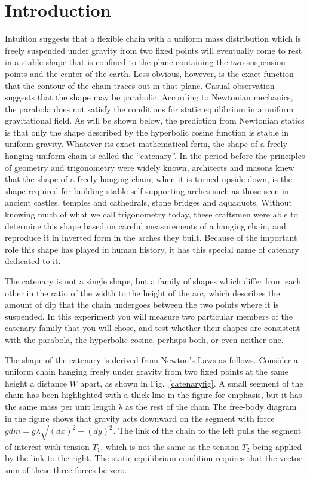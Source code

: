 \documentclass{revtex4}
\begin{document}
\section{Introduction}

Intuition suggests that a flexible chain with a uniform mass distribution
which is freely suspended under gravity from two fixed points will eventually
come to rest in a stable shape that is confined to the plane containing the
two suspension points and the center of the earth. Less obvious, however,
is the exact function that the contour of the chain traces out in that plane.
Casual observation suggests that the shape may be parabolic.  According to
Newtonian mechanics, the parabola does not satisfy the conditions for static
equilibrium in a uniform gravitational field.  As will be shown below, the
prediction from Newtonian statics is that only the shape described by the
hyperbolic cosine function is stable in uniform gravity.  Whatever its exact
mathematical form, the shape of a freely hanging uniform chain is called the
``catenary''.  In the period before the principles of geometry and
trigonometry were widely known, architects and masons knew that the shape
of a freely hanging chain, when it is turned upside-down, is the shape
required for building stable self-supporting arches such as those seen in
ancient castles, temples and cathedrals, stone bridges and aquaducts.
Without knowing much of what we call trigonometry today, these craftsmen
were able to determine this shape based on careful measurements of a hanging
chain, and reproduce it in inverted form in the arches they built. Because
of the important role this shape has played in human history, it has this
special name of catenary dedicated to it.

The catenary is not a single shape, but a family of shapes
which differ from each other in the ratio of the width to the height of the
arc, which describes the amount of dip that the chain undergoes between the
two points where it is suspended.  In this experiment you will measure two
particular members of the catenary family that you will chose, and test
whether their shapes are consistent with the parabola, the hyperbolic 
cosine, perhaps both, or even neither one.

The shape of the catenary is derived from Newton's Laws as follows. Consider
a uniform chain hanging freely under gravity from two fixed points at the
same height a distance $W$ apart, as shown in Fig.~\ref{catenaryfig}. A small
segment of the chain has been highlighted with a thick line in the figure for
emphasis, but it has the same mass per unit length λ as the rest of the chain
The free-body diagram in the figure shows that gravity acts downward on the
segment with force $gdm = g\lambda\sqrt{(dx)^2+(dy)^2}$.  The link
of the chain to the left pulls the segment of interest with tension $T_1$,
which is not the same as the tension $T_2$ being applied by the link to the
right. The static equilibrium condition requires that the vector sum of these
three forces be zero.
\end{document}
